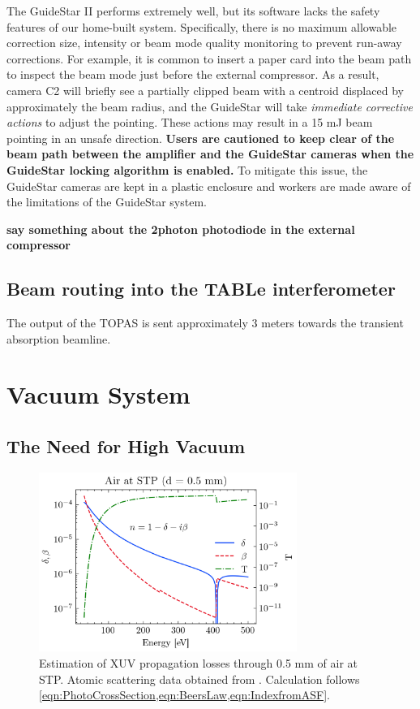 The GuideStar II performs extremely well, but its software lacks the safety features of our home-built system. Specifically, there is no maximum allowable correction size, intensity or beam mode quality monitoring to prevent run-away corrections. For example, it is common to insert a paper card into the beam path to inspect the beam mode just before the external compressor. As a result, camera C2 will briefly see a partially clipped beam with a centroid displaced by approximately the beam radius, and the GuideStar will take \textit{immediate corrective actions} to adjust the pointing. These actions may result in a 15 mJ beam pointing in an unsafe direction. \textbf{Users are cautioned to keep clear of the beam path between the amplifier and the GuideStar cameras when the GuideStar locking algorithm is enabled.} To mitigate this issue, the GuideStar cameras are kept in a plastic enclosure and workers are made aware of the limitations of the GuideStar system.

\textbf{say something about the 2photon photodiode in the external compressor}

\subsection{Beam routing into the TABLe interferometer}

The output of the TOPAS is sent approximately 3 meters towards the transient absorption beamline.

\section{Vacuum System}

\subsection{The Need for High Vacuum}

\begin{figure}
	\centering
	\includegraphics[width=0.75\textwidth]{figures/chap2/AirAbs.png}
	\caption{Estimation of XUV propagation losses through 0.5 mm of air at STP. Atomic scattering data obtained from \cite{gulliksonCXROXRayInteractions,henkeXRayInteractionsPhotoabsorption1993}. Calculation follows \cref{eqn:PhotoCrossSection,eqn:BeersLaw,eqn:IndexfromASF}.}
	\label{fig:AirAbs}
\end{figure}

